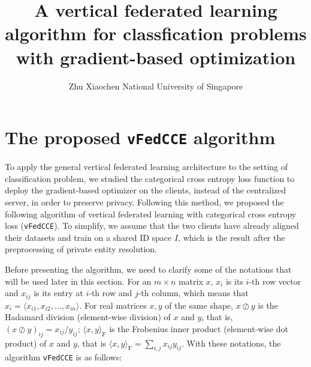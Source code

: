 \documentclass{article}
\title{A vertical federated learning algorithm for classfication problems with gradient-based optimization}
\author{Zhu Xiaochen \qquad National University of Singapore}
\date{}
\begin{document}
\maketitle
\section{The proposed \texttt{vFedCCE} algorithm}\label{secvfedcce}
  To apply the general vertical federated learning architecture to the setting of classification problem, we studied the categorical cross entropy loss function to deploy the gradient-based optimizer on the clients, instead of the centralized server, in order to preserve privacy. Following this method, we proposed the following algorithm of vertical federated learning with categorical cross entropy loss (\texttt{vFedCCE}). To simplify, we assume that the two clients have already aligned their datasets and train on a shared ID space $I$, which is the result after the preprocessing of private entity resolution.

  Before presenting the algorithm, we need to clarify some of the notations that will be used later in this section. For an $m\times n$ matrix $x$, $x_i$ is its $i$-th row vector and $x_{ij}$ is its entry at $i$-th row and $j$-th column, which means that $x_i=\langle x_{i1},x_{i2},\ldots,x_{in}\rangle$. For real matrices $x,y$ of the same shape, $x\oslash y$ is the Hadamard division (element-wise division) of $x$ and $y$, that is, $(x\oslash y)_{ij}={x_{ij}}/{y_{ij}}$; $\langle x,y\rangle_\mathrm{F}$ is the Frobenius inner product (element-wise dot product) of $x$ and $y$, that is $\langle x,y\rangle_\mathrm{F}=\sum_{i,j}x_{ij}y_{ij}$. With these notations, the algorithm \texttt{vFedCCE} is as follows:
\end{document}
